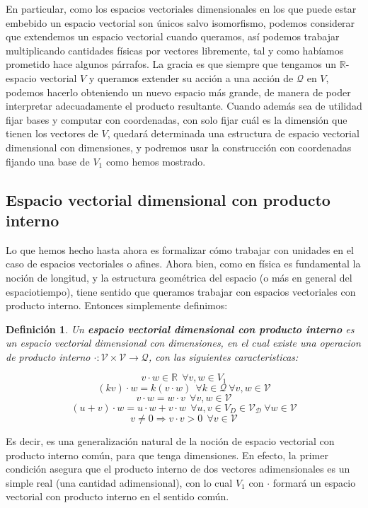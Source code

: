 \documentclass{article}
\def\Quantities{\mathcal Q}
\newtheorem{definicion}{{\sc Definición}}
\begin{document}
En particular, como los espacios vectoriales dimensionales en los que puede estar embebido un espacio vectorial son únicos salvo isomorfismo, podemos considerar que extendemos
un espacio vectorial cuando queramos, así podemos trabajar multiplicando cantidades físicas por vectores libremente, tal y como habíamos prometido hace algunos párrafos.
La gracia es que siempre que tengamos un $\mathbb{R}$-espacio vectorial $V$ y queramos extender su acción a una acción de $\Quantities$ en
$V$, podemos hacerlo obteniendo un nuevo espacio más grande, de manera de poder interpretar adecuadamente el producto resultante.
Cuando además sea de utilidad fijar bases y computar con coordenadas, con solo fijar cuál es la dimensión que tienen los vectores de $V$,
quedará determinada una estructura de espacio vectorial dimensional con dimensiones, y podremos usar la construcción con coordenadas
fijando una base de $V_1$ como hemos mostrado.

\subsection{Espacio vectorial dimensional con producto interno}

Lo que hemos hecho hasta ahora es formalizar cómo trabajar con unidades en el caso de espacios vectoriales o afines. Ahora bien,
como en física es fundamental la noción de longitud, y la estructura geométrica del espacio (o más en general del espaciotiempo),
tiene sentido que queramos trabajar con espacios vectoriales con producto interno. Entonces simplemente definimos:

\begin{definicion}
Un \textbf{espacio vectorial dimensional con producto interno} es un espacio vectorial dimensional con dimensiones, en el cual
existe una operacion de producto interno $\cdot : \mathcal{V} \times \mathcal{V} \rightarrow \Quantities$, con las siguientes caracteristicas:

$$v \cdot w \in \mathbb{R} \ \ \forall v,w \in V_1$$
$$(kv) \cdot w = k (v \cdot w) \ \ \forall k \in \Quantities \ \forall v,w \in \mathcal{V}$$
$$v \cdot w = w \cdot v \ \ \forall v,w \in \mathcal{V}$$
$$(u+v) \cdot w = u \cdot w + v \cdot w  \ \ \forall u,v \in V_D \in \mathcal{V_D} \ \forall w \in \mathcal{V}$$
$$v \neq 0 \Rightarrow v \cdot v > 0 \ \ \forall v \in \mathcal{V}$$
\end{definicion}

Es decir, es una generalización natural de la noción de espacio vectorial con producto interno común, para que tenga dimensiones.
En efecto, la primer condición asegura que el producto interno de dos vectores adimensionales es un simple real (una cantidad
adimensional), con lo cual $V_1$ con $\cdot$ formará un espacio vectorial con producto interno en el sentido común.
\end{document}
